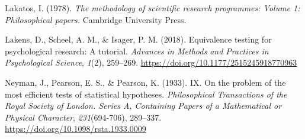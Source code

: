 \documentclass[english,doc,floatsintext]{apa6}
\begin{document}
\leavevmode\hypertarget{ref-lakatos1978}{}%
Lakatos, I. (1978). \emph{The methodology of scientific research programmes: Volume 1: Philosophical papers.} Cambridge University Press.

\leavevmode\hypertarget{ref-lakens2018}{}%
Lakens, D., Scheel, A. M., \& Isager, P. M. (2018). Equivalence testing for psychological research: A tutorial. \emph{Advances in Methods and Practices in Psychological Science}, \emph{1}(2), 259--269. \url{https://doi.org/10.1177/2515245918770963}

\leavevmode\hypertarget{ref-neyman1933}{}%
Neyman, J., Pearson, E. S., \& Pearson, K. (1933). IX. On the problem of the most efficient tests of statistical hypotheses. \emph{Philosophical Transactions of the Royal Society of London. Series A, Containing Papers of a Mathematical or Physical Character}, \emph{231}(694-706), 289--337. \url{https://doi.org/10.1098/rsta.1933.0009}

\endgroup
\end{document}
